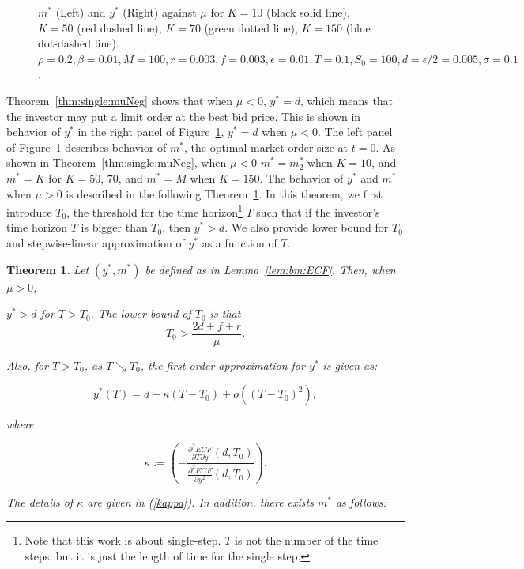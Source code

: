 \documentclass[11pt]{article}
\theoremstyle{plain}
\numberwithin{equation}{section}
\newtheorem{thm}{Theorem}[section]
\begin{document}
{\begin{figure}
	\caption{$m^*$ (Left) and $y^*$ (Right) against $\mu$ for $K=10$ (black solid line), $K=50$ (red dashed line), $K=70$ (green dotted line), $K=150$ (blue dot-dashed line). $\rho=0.2, \beta=0.01, M=100, r=0.003, f=0.003, \epsilon=0.01, T=0.1, S_0=100, d=\epsilon/2=0.005, \sigma=0.1$. }
	\label{mystar_againstMu_diffK}
\end{figure}

{
\par Theorem~\ref{thm:single:muNeg} shows that when $\mu<0$, $y^*=d$, which means that the investor may put a limit order at the best bid price. This is shown in behavior of $y^*$ in the right panel of Figure~\ref{mystar_againstMu_diffK}, $y^*=d$ when $\mu<0$. The left panel of Figure~\ref{mystar_againstMu_diffK} describes behavior of $m^*$, the optimal market order size at $t=0$. As shown in Theorem~\ref{thm:single:muNeg}, when $\mu<0$    $m^*=m^*_2$ when $K=10$, and $m^*=K$ for $K=50$, $70$, and $m^*=M$ when $K=150$. The behavior of $y^*$ and $m^*$ when $\mu>0$ is described in the following Theorem~\ref{thm:single:muPos}. In this theorem, we first introduce $T_0$, the threshold for the time horizon\footnote{Note that this work is about single-step. $T$ is not the number of the time steps, but it is just the length of time for the single step. } $T$ such that if the investor's time horizon  $T$  is bigger than $T_0$, then $y^*>d$. We also provide lower bound for $T_0$ and stepwise-linear approximation of $y^*$ as a function of $T$. 
}



{

\begin{thm}\label{thm:single:muPos}
	Let $(y^*, m^*)$ be defined as in Lemma~\ref{lem:bm:ECF}. Then, when $\mu>0$,

	$y^*>d$  for $T>T_0$. The lower bound of $T_0$ is that $$T_0>\frac{2d+f+r}{\mu} .$$ %

	
	Also, for $T>T_0$, as $T\searrow T_0 $, the first-order approximation for $y^*$ is given as:
	{
	$$ y^*(T)= d+ \kappa (T-T_0) + o ((T-T_0)^2),$$
	
	where
	
	
	
	$$\kappa:=\left(- \frac{\frac{\partial^2 ECF}{\partial T \partial y } (d, T_0 )}{\frac{\partial^2 ECF}{\partial y^2 } (d, T_0 )} \right). $$
	}
	The details of $\kappa$ are given in (\ref{kappa}).
	In addition, there exists $m^*$ as follows:


\end{thm}}}
\end{document}
